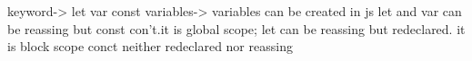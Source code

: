 keyword-> let var const
variables-> variables can be created in js 
let and var can be reassing but const con't.it is global scope;
let  can be reassing but redeclared. it is block scope
conct neither redeclared nor reassing